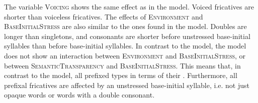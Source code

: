     \begin{table}
    	\caption{ Summary of linear model for variables predicting the relative  duration of [s] in prefixed words}
    	\label{tbl: summary model5}
    	
    	
    \end{table}
  
The variable \textsc{Voicing} shows the same effect as in the  model. Voiced fricatives are shorter than voiceless fricatives.
The effects of \textsc{Environment} and \textsc{BaseInitialStress} are also similar to the ones found in the  model. Doubles are longer than singletons, and consonants are shorter before unstressed base-initial syllables than before  base-initial syllables. 
In contrast to the  model, the  model does not show an interaction between \textsc{Environment} and \textsc{BaseInitialStress}, or between \textsc{SemanticTransparency} and \textsc{BaseInitialStress}. This means that, in contrast to the  model,  all prefixed types  in terms of their . Furthermore, all prefixal fricatives are affected by an unstressed base-initial syllable, i.e. not just opaque words or words with a double consonant.


